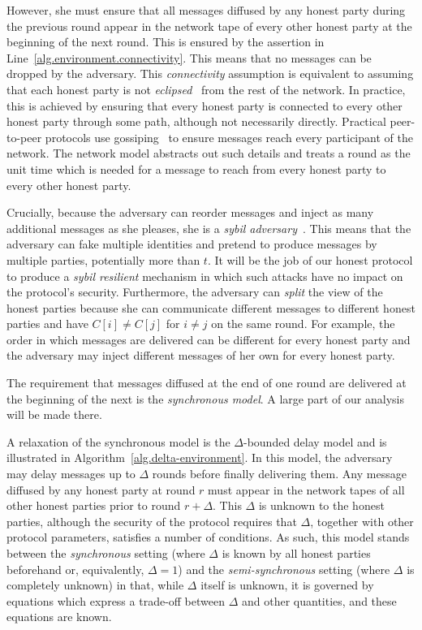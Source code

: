 However, she must ensure that all messages diffused by any honest party
during the previous round appear in the network tape of every other honest party
at the beginning of the next round. This is ensured by the assertion in Line~\ref{alg.environment.connectivity}. This means that no messages can be dropped
by the adversary. This \emph{connectivity} assumption is equivalent to assuming
that each honest party is not \emph{eclipsed}~\cite{eclipse,eclipse-ethereum}
from the rest of the network. In practice, this is achieved by ensuring that
every honest party is connected to every other honest party through some path,
although not necessarily directly. Practical peer-to-peer protocols use
gossiping~\cite{gossip} to ensure messages reach every participant of the network. The network
model abstracts out such details and treats a round as the unit time which is
needed for a message to reach from every honest party to every other honest
party.

Crucially, because the adversary can reorder messages and inject as many
additional messages as she pleases, she is a
\emph{sybil adversary}~\cite{sybil}. This means that the adversary can fake
multiple identities and pretend to produce messages by multiple parties,
potentially more than $t$. It will be the job of our honest protocol to produce
a \emph{sybil resilient} mechanism in which such attacks have no impact on the
protocol's security. Furthermore, the adversary can \emph{split} the view of the
honest parties because she can communicate different messages to different
honest parties and have $C[i] \neq C[j]$ for $i \neq j$ on the same round. For example, the order in which messages are delivered can be
different for every honest party and the adversary may inject different messages
of her own for every honest party.

The requirement that messages diffused at the end of one round are delivered at
the beginning of the next is the \emph{synchronous model}. A
large part of our analysis will be made there.



A relaxation of the synchronous model is the $\Delta$-bounded
delay model and is illustrated in Algorithm~\ref{alg.delta-environment}. In this model, the adversary may
delay messages up to $\Delta$ rounds before finally delivering them. Any message
diffused by any honest party at round $r$ must appear in the network tapes of
all other honest parties prior to round $r + \Delta$. This $\Delta$ is unknown
to the honest parties, although the security of the protocol requires that
$\Delta$, together with other protocol parameters, satisfies a number of
conditions. As such, this model stands between the \emph{synchronous} setting
(where $\Delta$ is known by all honest parties beforehand or, equivalently,
$\Delta = 1$) and the \emph{semi-synchronous} setting (where $\Delta$ is
completely unknown) in that, while $\Delta$ itself is unknown, it is governed by
equations which express a trade-off between $\Delta$ and other quantities, and
these equations are known.

